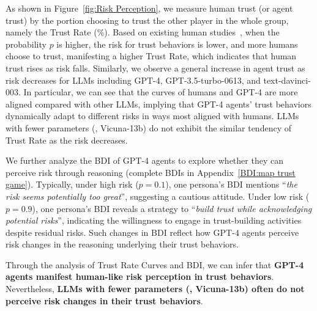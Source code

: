 As shown in Figure~\ref{fig:Risk Perception}, we measure human trust (or agent trust) by the portion choosing to trust the other player in the whole group, namely the Trust Rate (\%).
Based on existing human studies~\citep{BOHNET2004467}, when the probability \(p\) is higher, the risk for trust behaviors is lower, and more humans choose to trust, manifesting a higher Trust Rate, which indicates that human trust rises as risk falls. Similarly, we observe a general increase in agent trust as risk decreases for LLMs including GPT-4, GPT-3.5-turbo-0613, and text-davinci-003.
In particular, we can see that the curves of humans and GPT-4 are more aligned compared with other LLMs, implying that GPT-4 agents' trust behaviors dynamically adapt to different risks in ways most aligned with humans. LLMs with fewer parameters (\eg, Vicuna-13b) do not exhibit the similar tendency of Trust Rate as the risk decreases.



We further analyze the BDI of GPT-4 agents to explore whether they can perceive risk through reasoning (complete BDIs in Appendix~\ref{BDI:map trust game}). Typically, under high risk ($p=0.1$), one persona's BDI mentions ``\textit{the risk seems potentially too great}'', suggesting a cautious attitude.  Under low risk ($p=0.9$), one persona's BDI reveals a strategy to ``\textit{build trust while acknowledging potential risks}'', indicating the willingness to engage in trust-building activities despite residual risks. Such changes in BDI reflect how GPT-4 agents perceive risk changes in the reasoning underlying their trust behaviors.

Through the analysis of Trust Rate Curves and BDI, we can infer that \textbf{GPT-4 agents manifest human-like risk perception in trust behaviors}. Nevertheless, \textbf{LLMs with fewer parameters (\eg, Vicuna-13b) often do not perceive risk changes in their trust behaviors}.







\vspace{-0.2cm}
